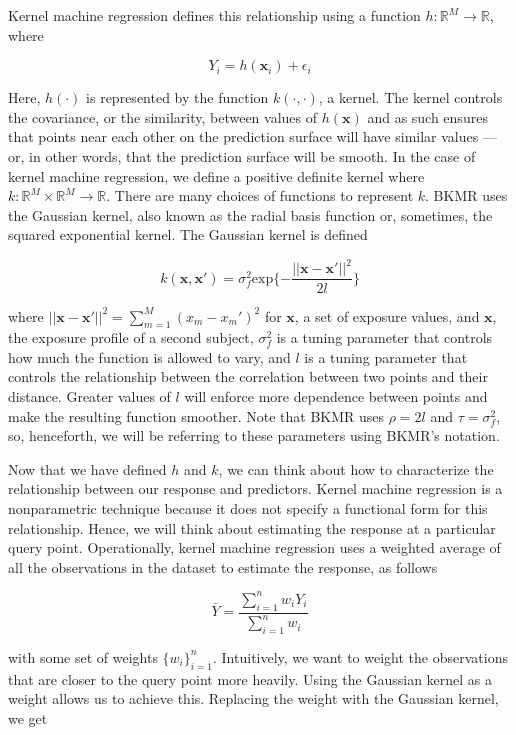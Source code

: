 \documentclass[12pt, twoside]{amherstthesis}
\begin{document}
Kernel machine regression defines this relationship using a function \(h: \mathbb{R}^M \rightarrow \mathbb{R}\), where

\[
Y_i = h(\textbf{x}_i) + \epsilon_i
\]

\noindent Here, \(h(\cdot)\) is represented by the function \(k(\cdot, \cdot)\), a kernel. The kernel controls the covariance, or the similarity, between values of \(h(\textbf{x})\) and as such ensures that points near each other on the prediction surface will have similar values --- or, in other words, that the prediction surface will be smooth. In the case of kernel machine regression, we define a positive definite kernel where \(k: \mathbb{R}^M\times \mathbb{R}^M \rightarrow \mathbb{R}\). There are many choices of functions to represent \(k\). BKMR uses the Gaussian kernel, also known as the radial basis function or, sometimes, the squared exponential kernel. The Gaussian kernel is defined

\[
k(\textbf{x}, \textbf{x}') = \sigma_f^2\textrm{exp}\{
-\frac{||\textbf{x}-\textbf{x}'||^2}{2l}\}
\]

\noindent where \(||\textbf{x}-\textbf{x}'||^2 = \sum_{m=1}^M{(x_{m}-x_{m}')^2}\) for \(\textbf{x}\), a set of exposure values, and \(\textbf{x}\), the exposure profile of a second subject, \(\sigma_f^2\) is a tuning parameter that controls how much the function is allowed to vary, and \(l\) is a tuning parameter that controls the relationship between the correlation between two points and their distance. Greater values of \(l\) will enforce more dependence between points and make the resulting function smoother. Note that BKMR uses \(\rho=2l\) and \(\tau=\sigma_f^2\), so, henceforth, we will be referring to these parameters using BKMR's notation.

Now that we have defined \(h\) and \(k\), we can think about how to characterize the relationship between our response and predictors. Kernel machine regression is a nonparametric technique because it does not specify a functional form for this relationship. Hence, we will think about estimating the response at a particular query point. Operationally, kernel machine regression uses a weighted average of all the observations in the dataset to estimate the response, as follows

\[
\bar{Y} = \frac{\sum_{i=1}^nw_iY_i}{\sum_{i=1}^nw_i}
\]

\noindent with some set of weights \(\{w_i\}_{i=1}^n\). Intuitively, we want to weight the observations that are closer to the query point more heavily. Using the Gaussian kernel as a weight allows us to achieve this. Replacing the weight with the Gaussian kernel, we get
\end{document}
